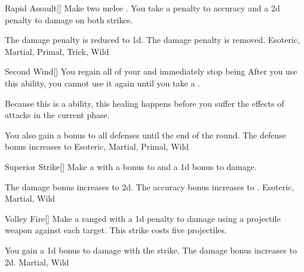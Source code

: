 \lowercase{\hypertarget{maneuver:Rapid Assault}{}}\label{maneuver:Rapid Assault}
\hypertarget{maneuver:Rapid Assault}{}
\begin{freeability}[Rank 4]{Rapid Assault}[]
Make two melee .
You take a  penalty to accuracy and a \minus2d penalty to damage on both strikes.

\rankline
{} The damage penalty is reduced to \minus1d.
 The damage penalty is removed.
 Esoteric, Martial, Primal, Trick, Wild
\end{freeability}
\vspace{0.25em}



\lowercase{\hypertarget{maneuver:Second Wind}{}}\label{maneuver:Second Wind}
\hypertarget{maneuver:Second Wind}{}
\begin{freeability}[Rank 4]{Second Wind}[]
You regain all of your  and immediately stop being 
After you use this ability, you cannot use it again until you take a .

Because this is a  ability, this healing happens before you suffer the effects of attacks in the current phase.

\rankline
{} You also gain a  bonus to all defenses until the end of the round.
 The defense bonus increases to 
 Esoteric, Martial, Primal, Wild
\end{freeability}
\vspace{0.25em}



\lowercase{\hypertarget{maneuver:Superior Strike}{}}\label{maneuver:Superior Strike}
\hypertarget{maneuver:Superior Strike}{}
\begin{freeability}[Rank 4]{Superior Strike}[]
Make a  with a  bonus to  and a \plus1d bonus to damage.

\rankline
{} The damage bonus increases to \plus2d.
 The accuracy bonus increases to .
 Esoteric, Martial, Wild
\end{freeability}
\vspace{0.25em}



\lowercase{\hypertarget{maneuver:Volley Fire}{}}\label{maneuver:Volley Fire}
\hypertarget{maneuver:Volley Fire}{}
\begin{freeability}[Rank 4]{Volley Fire}[]
Make a ranged  with a \minus1d penalty to damage using a projectile weapon against each target.
This strike costs five projectiles.

\rankline
{} You gain a \plus1d bonus to damage with the strike.
 The damage bonus increases to \plus2d.
 Martial, Wild
\end{freeability}
\vspace{0.25em}


